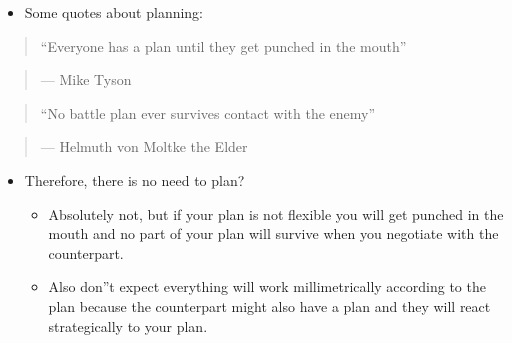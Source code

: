 \documentclass[
  ignorenonframetext,
]{beamer}
\providecommand{\tightlist}{%
  \setlength{\itemsep}{0pt}\setlength{\parskip}{0pt}}\usepackage{longtable,booktabs,array}
\begin{document}
\begin{frame}{}
\label{section-2}
\begin{itemize}
\tightlist
\item
  Some quotes about planning:
\end{itemize}

\begin{quote}
\end{quote}

\begin{quote}
``Everyone has a plan until they get punched in the mouth''
\end{quote}

\begin{quote}
\hfill --- Mike Tyson
\end{quote}

\begin{quote}
``No battle plan ever survives contact with the enemy''
\end{quote}

\begin{quote}
\hfill --- Helmuth von Moltke the Elder
\end{quote}

\begin{quote}
\end{quote}

\begin{itemize}
\item
  Therefore, there is no need to plan?

  \begin{itemize}
  \item
    Absolutely not, but if your plan is not flexible you will get
    punched in the mouth and no part of your plan will survive when you
    negotiate with the counterpart.
  \item
    Also don''t expect everything will work millimetrically according to
    the plan because the counterpart might also have a plan and they
    will react strategically to your plan.
  \end{itemize}
\end{itemize}
\end{frame}
\end{document}
